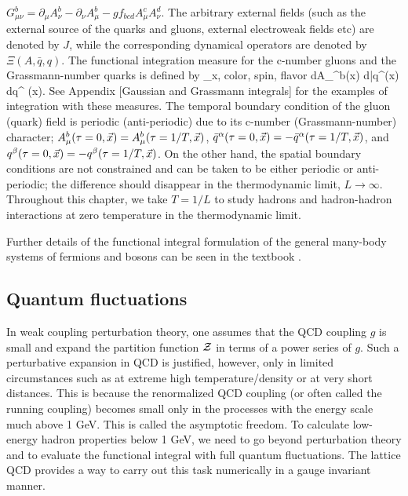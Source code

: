  $G_{\mu \nu}^b= \partial_{\mu}A_{\nu}^b - \partial_{\nu} A_{\mu}^b -g f_{bcd} A_{\mu}^c A_{\nu}^d$.
 The arbitrary external fields (such as the external source of the quarks and gluons,
 external electroweak fields etc) are denoted by $J$, while the corresponding dynamical operators 
  are denoted by $\Xi (A, \bar{q}, q)$.  The functional integration measure for the 
 c-number gluons and the Grassmann-number quarks is defined by
 \beq
 [dA d\bar{q} dq] \equiv \prod_{x, {\rm color, spin, flavor}}  dA_{\mu}^b(x) d\bar{q}^{\alpha}(x)  dq^{\beta} (x).
\eeq 
See Appendix [Gaussian and Grassmann integrals] for the examples of integration with these measures.
The temporal boundary condition of the gluon (quark) field is periodic (anti-periodic) due to its
c-number (Grassmann-number) character;  $A_{\mu}^b (\tau=0, \vec{x})=A_{\mu}^b (\tau=1/T, \vec{x})$,
$\bar{q}^{\alpha}(\tau=0,\vec{x})=-\bar{q}^{\alpha}(\tau=1/T,\vec{x})$, and 
$q^{\beta}(\tau=0,\vec{x})=-q^{\beta}(\tau=1/T,\vec{x})$.    On the other hand, the spatial boundary conditions are 
not constrained and can be taken to be either periodic or anti-periodic; the difference should disappear in the 
thermodynamic limit, $L \rightarrow \infty$.
 Throughout this chapter, we take $T = 1/L $   to
  study hadrons and hadron-hadron interactions at zero temperature in the thermodynamic limit.

Further details of the functional integral formulation of the general many-body systems of fermions and bosons
can be seen in the textbook \cite{Negele:1988vy}.

 \subsection{Quantum fluctuations}
In weak coupling perturbation theory, one assumes that the QCD coupling $g$  is small and expand the partition function
 ${\cal Z}$ in terms of a power series of $g$.  Such a perturbative expansion in QCD is justified, however, only in  limited 
 circumstances  such as at extreme high  temperature/density  or at very short distances. This is because  the 
  renormalized QCD coupling (or often called the running coupling) becomes small only in the processes 
  with the energy scale much above 1 GeV. This is called the asymptotic freedom.
 To calculate low-energy hadron properties below 1 GeV,
  we need to go beyond perturbation theory and to evaluate the functional integral with full quantum fluctuations.
 The lattice QCD provides a way to carry out this task numerically in a gauge invariant manner. 
 

